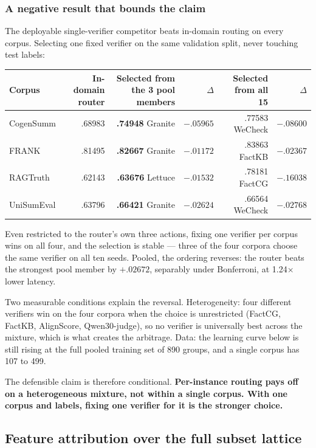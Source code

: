 \documentclass[10pt,a4paper]{article}
\newcommand{\fix}[1]{\textcolor{red!65!black}{#1}}
\begin{document}
\subsubsection{A negative result that bounds the claim}

\fix{The deployable single-verifier competitor beats in-domain routing on every corpus.} Selecting
one fixed verifier on the same validation split, never touching test labels:

\begin{center}\small
\begin{tabular}{lrrrrr}
\toprule
Corpus & In-domain router & Selected from the 3 pool members & $\Delta$ & Selected from all 15 & $\Delta$ \\
\midrule
CogenSumm & .68983 & \textbf{.74948} Granite & $-.05965$ & .77583 WeCheck & $-.08600$ \\
FRANK & .81495 & \textbf{.82667} Granite & $-.01172$ & .83863 FactKB & $-.02367$ \\
RAGTruth & .62143 & \textbf{.63676} Lettuce & $-.01532$ & .78181 FactCG & $-.16038$ \\
UniSumEval & .63796 & \textbf{.66421} Granite & $-.02624$ & .66564 WeCheck & $-.02768$ \\
\bottomrule
\end{tabular}
\end{center}

Even restricted to the router's own three actions, fixing one verifier per corpus wins on all
four, and the selection is stable --- three of the four corpora choose the same verifier on all
ten seeds. Pooled, the ordering reverses: the router beats the strongest pool member by $+.02672$,
separably under Bonferroni, at 1.24$\times$ lower latency.

Two measurable conditions explain the reversal. Heterogeneity: four different verifiers win on
the four corpora when the choice is unrestricted (FactCG, FactKB, AlignScore, Qwen30-judge), so no
verifier is universally best across the mixture, which is what creates the arbitrage. Data: the
learning curve below is still rising at the full pooled training set of 890 groups, and a single
corpus has 107 to 499.

The defensible claim is therefore conditional. \textbf{Per-instance routing pays off on a
heterogeneous mixture, not within a single corpus. With one corpus and labels, fixing one verifier
for it is the stronger choice.}

\subsection{Feature attribution over the full subset lattice}
\label{sec:shap}
\end{document}
